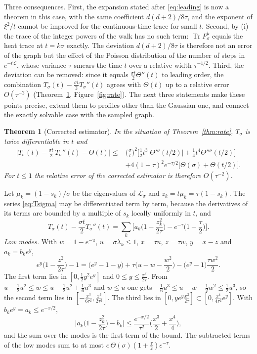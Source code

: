 \documentclass[11pt,a4paper]{article}
\makeatletter
\theoremstyle{stmt}
\newtheorem{theorem}{Theorem}[section]
\theoremstyle{defn}
\theoremstyle{rmk}
\renewenvironment{proof}[1][\proofname]{\par\pushQED{\qed}\normalfont\topsep6\p@\@plus6\p@\relax
  \trivlist\item[\hskip\labelsep{\sffamily\itshape\small #1.}]\ignorespaces}{\popQED\endtrivlist\@endpefalse}
\numberwithin{equation}{section}
\DeclareMathOperator{\Tr}{Tr}
\newcommand{\Lc}{\mathcal{L}}
\makeatother
\begin{document}
{Three consequences. First, the expansion stated after \eqref{eq:leading} is now a theorem in this case, with the same coefficient $d(d+2)/8\tau$, and the exponent of $\xi^2/t$ cannot be improved for the continuous-time trace for small $t$. Second, by (i) the trace of the integer powers of the walk has no such term: $\Tr P_\sigma^k$ equals the heat trace at $t=k\sigma$ exactly. The deviation $d(d+2)/8\tau$ is therefore not an error of the graph but the effect of the Poisson distribution of the number of steps in $e^{-t\Lc}$, whose variance $\tau$ smears the time $t$ over a relative width $\tau^{-1/2}$. Third, the deviation can be removed: since it equals $\frac{\sigma t}{2}\Theta''(t)$ to leading order, the combination $T_\sigma(t)-\frac{\sigma t}{2}T_\sigma''(t)$ agrees with $\Theta(t)$ up to a relative error $O(\tau^{-2})$ (Theorem~\ref{thm:corrected}, Figure~\ref{fig:rate}). The next three statements make these points precise, extend them to profiles other than the Gaussian one, and connect the exactly solvable case with the sampled graph.

\begin{theorem}[Corrected estimator]\label{thm:corrected}
In the situation of Theorem~\ref{thm:rate}, $T_\sigma$ is twice differentiable in $t$ and
\begin{align*}
\Big|T_\sigma(t)-\frac{\sigma t}{2}\,T_\sigma''(t)-\Theta(t)\Big|\le{}&\Big(\frac\sigma t\Big)^{2}\Big[\tfrac12t^3|\Theta'''(t/2)|+\tfrac14t^4\Theta''''(t/2)\Big]\\
&+4(1+\tau)^2e^{-\tau/2}\big[\Theta(\sigma)+\Theta(t/2)\big].
\end{align*}
For $t\le1$ the relative error of the corrected estimator is therefore $O(\tau^{-2})$.
\end{theorem}

\begin{proof}
Let $\mu_k=(1-s_k)/\sigma$ be the eigenvalues of $\Lc_\sigma$ and $z_k=t\mu_k=\tau(1-s_k)$. The series \eqref{eq:Tsigma} may be differentiated term by term, because the derivatives of its terms are bounded by a multiple of $s_k$ locally uniformly in $t$, and
\[
T_\sigma(t)-\frac{\sigma t}{2}T_\sigma''(t)=\sum_k\Big[a_k\Big(1-\frac{z_k^2}{2\tau}\Big)-e^{-\tau}\Big(1-\frac\tau2\Big)\Big].
\]
\emph{Low modes.} With $w=1-e^{-u}$, $u=\sigma\lambda_k\le1$, $x=\tau u$, $z=\tau w$, $y=x-z$ and $a_k=b_ke^{y}$,
\[
e^{y}\Big(1-\frac{z^2}{2\tau}\Big)-1=\big(e^{y}-1-y\big)+\tau\Big(u-w-\frac{w^2}2\Big)-\big(e^{y}-1\big)\frac{\tau w^2}{2}.
\]
The first term lies in $[0,\tfrac12y^2e^{y}]$ and $0\le y\le\tfrac{x^2}{2\tau}$. From $u-\tfrac12u^2\le w\le u-\tfrac12u^2+\tfrac16u^3$ and $w\le u$ one gets $-\tfrac16u^3\le u-w-\tfrac12w^2\le\tfrac12u^3$, so the second term lies in $[-\tfrac{x^3}{6\tau^2},\tfrac{x^3}{2\tau^2}]$. The third lies in $[0,ye^{y}\tfrac{x^2}{2\tau}]\subset[0,\tfrac{x^4}{4\tau^2}e^{y}]$. With $b_ke^{y}=a_k\le e^{-x/2}$,
\[
\Big|a_k\Big(1-\frac{z_k^2}{2\tau}\Big)-b_k\Big|\le\frac{e^{-x/2}}{\tau^2}\Big(\frac{x^3}{2}+\frac{x^4}{4}\Big),
\]
and the sum over the modes is the first term of the bound. The subtracted terms of the low modes sum to at most $e\,\Theta(\sigma)(1+\tfrac\tau2)e^{-\tau}$.


\end{proof}}
\end{document}
